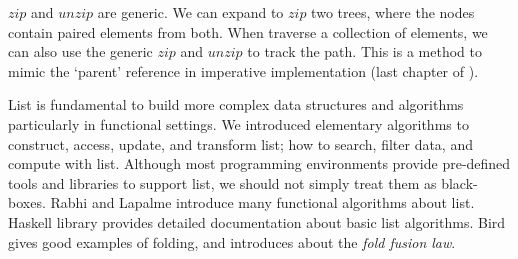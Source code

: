 \documentclass[b5paper]{article}
\begin{document}
$zip$ and $unzip$ are generic. We can expand to $zip$ two trees, where the nodes contain paired elements from both. When traverse a collection of elements, we can also use the generic $zip$ and $unzip$ to track the path. This is a method to mimic the `parent' reference in imperative implementation (last chapter of \cite{learn-haskell}).

List is fundamental to build more complex data structures and algorithms particularly in functional settings. We introduced elementary algorithms to construct, access, update, and transform list; how to search, filter data, and compute with list. Although most programming environments provide pre-defined tools and libraries to support list, we should not simply treat them as black-boxes. Rabhi and Lapalme introduce many functional algorithms about list\cite{algo-fp}. Haskell library provides detailed documentation about basic list algorithms. Bird gives good examples of folding\cite{fp-pearls}, and introduces about the {\em fold fusion law}.
\end{document}
